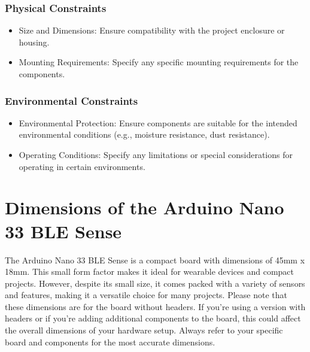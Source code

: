 \subsubsection*{Physical Constraints}
\begin{itemize}[label=--]
	\item Size and Dimensions: Ensure compatibility with the project enclosure or housing.
	\item Mounting Requirements: Specify any specific mounting requirements for the components.
\end{itemize}

\subsubsection*{Environmental Constraints}
\begin{itemize}[label=--]
	\item Environmental Protection: Ensure components are suitable for the intended environmental conditions (e.g., moisture resistance, dust resistance).
	\item Operating Conditions: Specify any limitations or special considerations for operating in certain environments.
\end{itemize}

\section{Dimensions of the Arduino Nano 33 BLE Sense}


The Arduino Nano 33 BLE Sense is a compact board with dimensions of 45mm x 18mm. This small form factor makes it ideal for wearable devices and compact projects. However, despite its small size, it comes packed with a variety of sensors and features, making it a versatile choice for many projects.
Please note that these dimensions are for the board without headers. If you're using a version with headers or if you're adding additional components to the board, this could affect the overall dimensions of your hardware setup. Always refer to your specific board and components for the most accurate dimensions. \cite{Arduino:2023}


  
